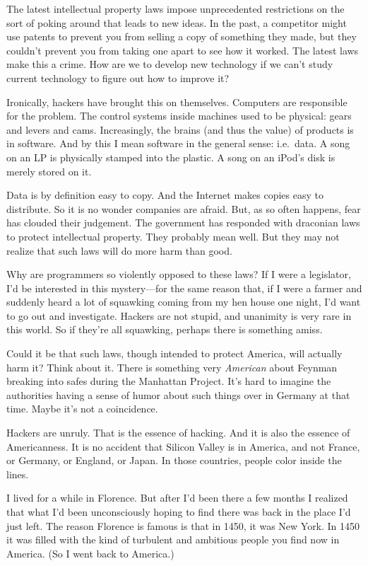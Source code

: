 The latest intellectual property laws impose unprecedented restrictions
on the sort of poking around that leads to new ideas. In the past, a
competitor might use patents to prevent you from selling a copy of
something they made, but they couldn't prevent you from taking one apart
to see how it worked. The latest laws make this a crime. How are we to
develop new technology if we can't study current technology to figure
out how to improve it?

Ironically, hackers have brought this on themselves. Computers are
responsible for the problem. The control systems inside machines used to
be physical: gears and levers and cams. Increasingly, the brains (and
thus the value) of products is in software. And by this I mean software
in the general sense: i.e.~data. A song on an LP is physically stamped
into the plastic. A song on an iPod's disk is merely stored on it.

Data is by definition easy to copy. And the Internet makes copies easy
to distribute. So it is no wonder companies are afraid. But, as so often
happens, fear has clouded their judgement. The government has responded
with draconian laws to protect intellectual property. They probably mean
well. But they may not realize that such laws will do more harm than
good.

Why are programmers so violently opposed to these laws? If I were a
legislator, I'd be interested in this mystery---for the same reason
that, if I were a farmer and suddenly heard a lot of squawking coming
from my hen house one night, I'd want to go out and investigate. Hackers
are not stupid, and unanimity is very rare in this world. So if they're
all squawking, perhaps there is something amiss.

Could it be that such laws, though intended to protect America, will
actually harm it? Think about it. There is something very
\emph{American} about Feynman breaking into safes during the Manhattan
Project. It's hard to imagine the authorities having a sense of humor
about such things over in Germany at that time. Maybe it's not a
coincidence.

Hackers are unruly. That is the essence of hacking. And it is also the
essence of Americanness. It is no accident that Silicon Valley is in
America, and not France, or Germany, or England, or Japan. In those
countries, people color inside the lines.

I lived for a while in Florence. But after I'd been there a few months I
realized that what I'd been unconsciously hoping to find there was back
in the place I'd just left. The reason Florence is famous is that in
1450, it was New York. In 1450 it was filled with the kind of turbulent
and ambitious people you find now in America. (So I went back to
America.)

